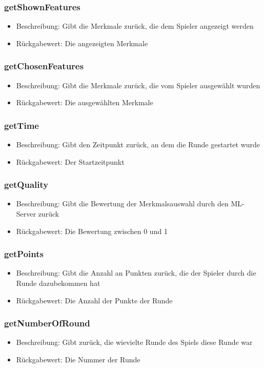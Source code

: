 \documentclass[a4paper]{scrreprt}
\begin{document}
	\subsubsection{getShownFeatures}
	\begin{itemize}
		\item Beschreibung: Gibt die Merkmale zurück, die dem Spieler angezeigt werden
		\item Rückgabewert: Die angezeigten Merkmale
	\end{itemize}
	\subsubsection{getChosenFeatures}
	\begin{itemize}
		\item Beschreibung: Gibt die Merkmale zurück, die vom Spieler ausgewählt wurden
		\item Rückgabewert: Die ausgewählten Merkmale
	\end{itemize}
	\subsubsection{getTime}
	\begin{itemize}
		\item Beschreibung: Gibt den Zeitpunkt zurück, an dem die Runde gestartet wurde
		\item Rückgabewert: Der Startzeitpunkt
	\end{itemize}
	\subsubsection{getQuality}
	\begin{itemize}
		\item Beschreibung: Gibt die Bewertung der Merkmalsauswahl durch den ML-Server zurück
		\item Rückgabewert: Die Bewertung zwischen 0 und 1
	\end{itemize}
	\subsubsection{getPoints}
	\begin{itemize}
		\item Beschreibung: Gibt die Anzahl an Punkten zurück, die der Spieler durch die Runde dazubekommen hat
		\item Rückgabewert: Die Anzahl der Punkte der Runde
	\end{itemize}
	\subsubsection{getNumberOfRound}
	\begin{itemize}
		\item Beschreibung: Gibt zurück, die wievielte Runde des Spiels diese Runde war
		\item Rückgabewert: Die Nummer der Runde
	\end{itemize}
\end{document}
